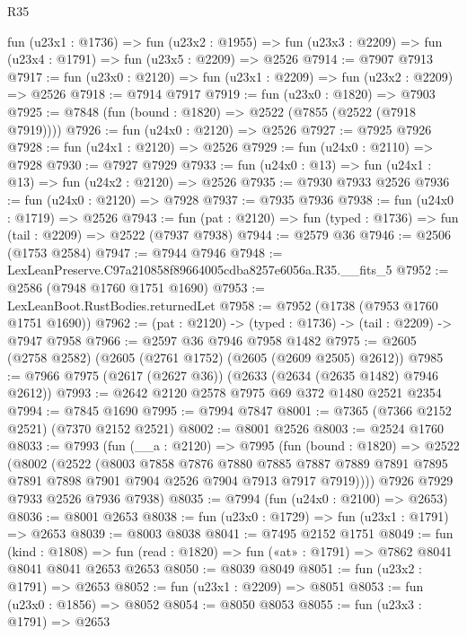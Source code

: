 \begin{lexlean}{R35}
\begin{coremodule}
  fun (u23x1 : @1736) =>
  fun (u23x2 : @1955) => fun (u23x3 : @2209) => fun (u23x4 : @1791) => fun (u23x5 : @2209) => @2526
@7914 := @7907 @7913
@7917 := fun (u23x0 : @2120) => fun (u23x1 : @2209) => fun (u23x2 : @2209) => @2526
@7918 := @7914 @7917
@7919 := fun (u23x0 : @1820) => @7903
@7925 := @7848 (fun (bound : @1820) => @2522 (@7855 (@2522 (@7918 @7919))))
@7926 := fun (u24x0 : @2120) => @2526
@7927 := @7925 @7926
@7928 := fun (u24x1 : @2120) => @2526
@7929 := fun (u24x0 : @2110) => @7928
@7930 := @7927 @7929
@7933 := fun (u24x0 : @13) => fun (u24x1 : @13) => fun (u24x2 : @2120) => @2526
@7935 := @7930 @7933 @2526
@7936 := fun (u24x0 : @2120) => @7928
@7937 := @7935 @7936
@7938 := fun (u24x0 : @1719) => @2526
@7943 := fun (pat : @2120) => fun (typed : @1736) => fun (tail : @2209) => @2522 (@7937 @7938)
@7944 := @2579 @36
@7946 := @2506 (@1753 @2584)
@7947 := @7944 @7946
@7948 := LexLeanPreserve.C97a210858f89664005cdba8257e6056a.R35.__fits_5
@7952 := @2586 (@7948 @1760 @1751 @1690)
@7953 := LexLeanBoot.RustBodies.returnedLet
@7958 := @7952 (@1738 (@7953 @1760 @1751 @1690))
@7962 := (pat : @2120) -> (typed : @1736) -> (tail : @2209) -> @7947 @7958
@7966 := @2597 @36 @7946 @7958 @1482
@7975 := @2605 (@2758 @2582) (@2605 (@2761 @1752) (@2605 (@2609 @2505) @2612))
@7985 := @7966 @7975 (@2617 (@2627 @36)) (@2633 (@2634 (@2635 @1482) @7946 @2612))
@7993 := @2642 @2120 @2578 @7975 @69 @372 @1480 @2521 @2354
@7994 := @7845 @1690
@7995 := @7994 @7847
@8001 := @7365 (@7366 @2152 @2521) (@7370 @2152 @2521)
@8002 := @8001 @2526
@8003 := @2524 @1760
@8033 := @7993
    (fun (__a : @2120) =>
    @7995
      (fun (bound : @1820) =>
      @2522
        (@8002
          (@2522
            (@8003
              @7858
              @7876
              @7880
              @7885
              @7887
              @7889
              @7891
              @7895
              @7891
              @7898
              @7901
              @7904
              @2526
              @7904
              @7913
              @7917
              @7919))))
      @7926
      @7929
      @7933
      @2526
      @7936
      @7938)
@8035 := @7994 (fun (u24x0 : @2100) => @2653)
@8036 := @8001 @2653
@8038 := fun (u23x0 : @1729) => fun (u23x1 : @1791) => @2653
@8039 := @8003 @8038
@8041 := @7495 @2152 @1751
@8049 := fun (kind : @1808) =>
  fun (read : @1820) => fun («at» : @1791) => @7862 @8041 @8041 @8041 @2653 @2653
@8050 := @8039 @8049
@8051 := fun (u23x2 : @1791) => @2653
@8052 := fun (u23x1 : @2209) => @8051
@8053 := fun (u23x0 : @1856) => @8052
@8054 := @8050 @8053
@8055 := fun (u23x3 : @1791) => @2653

\end{coremodule}
\end{lexlean}
